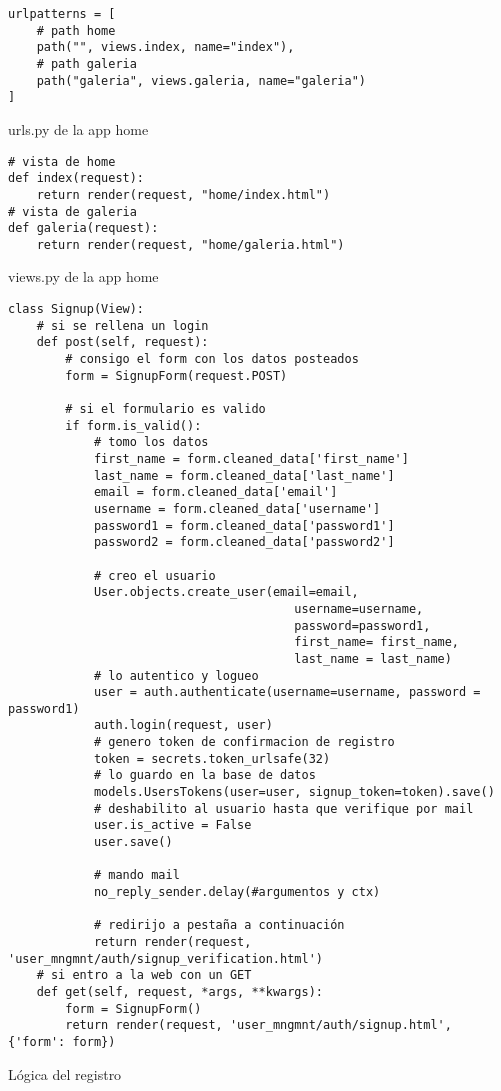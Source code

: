 \begin{listing}[H]
\begin{verbatim}
urlpatterns = [
    # path home
    path("", views.index, name="index"),
    # path galeria
    path("galeria", views.galeria, name="galeria")
]
\end{verbatim}
\caption{urls.py de la app home}
\label{urls.py_home}
\end{listing}

\begin{listing}[H]
\begin{verbatim}
# vista de home
def index(request):
    return render(request, "home/index.html")
# vista de galeria
def galeria(request):
    return render(request, "home/galeria.html")
\end{verbatim}
\caption{views.py de la app home}
\label{views.py_home}
\end{listing}


\begin{listing}[H]
\begin{verbatim}
class Signup(View):
    # si se rellena un login
    def post(self, request):     
        # consigo el form con los datos posteados
        form = SignupForm(request.POST)

        # si el formulario es valido
        if form.is_valid():
            # tomo los datos
            first_name = form.cleaned_data['first_name']
            last_name = form.cleaned_data['last_name']
            email = form.cleaned_data['email']
            username = form.cleaned_data['username']
            password1 = form.cleaned_data['password1']
            password2 = form.cleaned_data['password2']

            # creo el usuario
            User.objects.create_user(email=email, 
                                        username=username, 
                                        password=password1, 
                                        first_name= first_name, 
                                        last_name = last_name)
            # lo autentico y logueo
            user = auth.authenticate(username=username, password = password1)
            auth.login(request, user)
            # genero token de confirmacion de registro
            token = secrets.token_urlsafe(32)
            # lo guardo en la base de datos
            models.UsersTokens(user=user, signup_token=token).save()
            # deshabilito al usuario hasta que verifique por mail
            user.is_active = False
            user.save()
            
            # mando mail
            no_reply_sender.delay(#argumentos y ctx)

            # redirijo a pestaña a continuación
            return render(request, 'user_mngmnt/auth/signup_verification.html')    
    # si entro a la web con un GET
    def get(self, request, *args, **kwargs):
        form = SignupForm()
        return render(request, 'user_mngmnt/auth/signup.html', {'form': form})
\end{verbatim}
\caption{Lógica del registro}
\label{signup_user_mngmnt}
\end{listing}

